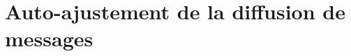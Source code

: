 
\chapter{Auto-ajustement de la diffusion de messages}
\label{net:chap:spray}
\minitoc
















